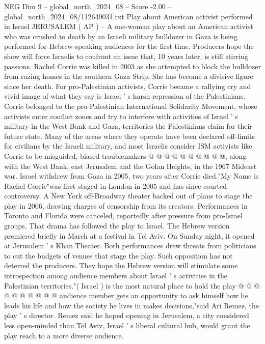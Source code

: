 \begin{textsample}{NEG Dim 9 – global\_north\_2024\_08 – Score -2.00 – global\_north\_2024\_08/112649031.txt}  \label{ex:f9_neg_258}
Play about American activist performed in Israel JERUSALEM ( AP ) -- A one-woman play about an American activist who was crushed to death by an Israeli military bulldozer in Gaza is being performed for Hebrew-speaking audiences for the first time.
Producers hope the show will force Israelis to confront an issue that, 10 years later, is still stirring passions.
Rachel Corrie was killed in 2003 as she attempted to block the bulldozer from razing homes in the southern Gaza Strip.
She has become a divisive figure since her death.
For pro-Palestinian activists, Corrie became a rallying cry and vivid image of what they say is Israel ' s harsh repression of the Palestinians.
Corrie belonged to the pro-Palestinian International Solidarity Movement, whose activists enter conflict zones and try to interfere with activities of Israel ' s military in the West Bank and Gaza, territories the Palestinians claim for their future state.
Many of the areas where they operate have been declared off-limits for civilians by the Israeli military, and most Israelis consider ISM activists like Corrie to be misguided, biased troublemakers @ @ @ @ @ @ @ @ @ @, along with the West Bank, east Jerusalem and the Golan Heights, in the 1967 Mideast war.
Israel withdrew from Gaza in 2005, two years after Corrie died."My Name is Rachel Corrie"was first staged in London in 2005 and has since courted controversy.
A New York off-Broadway theater backed out of plans to stage the play in 2006, drawing charges of censorship from its creators.
Performances in Toronto and Florida were canceled, reportedly after pressure from pro-Israel groups.
That drama has followed the play to Israel.
The Hebrew version premiered briefly in March at a festival in Tel Aviv.
On Sunday night, it opened at Jerusalem ' s Khan Theater.
Both performances drew threats from politicians to cut the budgets of venues that stage the play.
Such opposition has not deterred the producers.
They hope the Hebrew version will stimulate some introspection among audience members about Israel ' s activities in the Palestinian territories."( Israel ) is the most natural place to hold the play @ @ @ @ @ @ @ @ @ @ audience member gets an opportunity to ask himself how he leads his life and how the society he lives in makes decisions,"said Ari Remez, the play ' s director.
Remez said he hoped opening in Jerusalem, a city considered less open-minded than Tel Aviv, Israel ' s liberal cultural hub, would grant the play reach to a more diverse audience.

\end{textsample}
